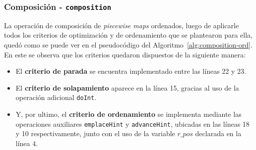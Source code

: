 \subsubsection{Composición - \texttt{composition}}

La operación de composición de \textit{piecewise maps} ordenados, luego de aplicarle todos los criterios de optimización y de ordenamiento que se plantearon para ella, quedó como se puede ver en el pseudocódigo del Algoritmo~\ref{alg:composition-ord}. En este se observa que los criterios quedaron dispuestos de la siguiente manera:

\begin{itemize}
    \item El \textbf{criterio de parada} se encuentra implementado entre las líneas 22 y 23.
    
    \item El \textbf{criterio de solapamiento} aparece en la línea 15, gracias al uso de la operación adicional \texttt{doInt}.
    
    \item Y, por ultimo, el \textbf{criterio de ordenamiento} se implementa mediante las operaciones auxiliares \texttt{emplaceHint} y \texttt{advanceHint}, ubicadas en las líneas 18 y 10 respectivamente, junto con el uso de la variable $r\_pos$ declarada en la línea 4.
\end{itemize}




